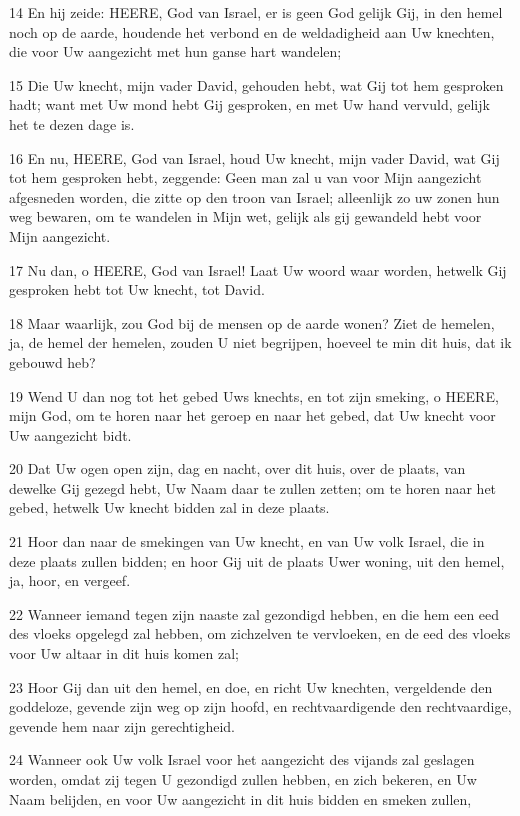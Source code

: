 \par 14 En hij zeide: HEERE, God van Israel, er is geen God gelijk Gij, in den hemel noch op de aarde, houdende het verbond en de weldadigheid aan Uw knechten, die voor Uw aangezicht met hun ganse hart wandelen;
\par 15 Die Uw knecht, mijn vader David, gehouden hebt, wat Gij tot hem gesproken hadt; want met Uw mond hebt Gij gesproken, en met Uw hand vervuld, gelijk het te dezen dage is.
\par 16 En nu, HEERE, God van Israel, houd Uw knecht, mijn vader David, wat Gij tot hem gesproken hebt, zeggende: Geen man zal u van voor Mijn aangezicht afgesneden worden, die zitte op den troon van Israel; alleenlijk zo uw zonen hun weg bewaren, om te wandelen in Mijn wet, gelijk als gij gewandeld hebt voor Mijn aangezicht.
\par 17 Nu dan, o HEERE, God van Israel! Laat Uw woord waar worden, hetwelk Gij gesproken hebt tot Uw knecht, tot David.
\par 18 Maar waarlijk, zou God bij de mensen op de aarde wonen? Ziet de hemelen, ja, de hemel der hemelen, zouden U niet begrijpen, hoeveel te min dit huis, dat ik gebouwd heb?
\par 19 Wend U dan nog tot het gebed Uws knechts, en tot zijn smeking, o HEERE, mijn God, om te horen naar het geroep en naar het gebed, dat Uw knecht voor Uw aangezicht bidt.
\par 20 Dat Uw ogen open zijn, dag en nacht, over dit huis, over de plaats, van dewelke Gij gezegd hebt, Uw Naam daar te zullen zetten; om te horen naar het gebed, hetwelk Uw knecht bidden zal in deze plaats.
\par 21 Hoor dan naar de smekingen van Uw knecht, en van Uw volk Israel, die in deze plaats zullen bidden; en hoor Gij uit de plaats Uwer woning, uit den hemel, ja, hoor, en vergeef.
\par 22 Wanneer iemand tegen zijn naaste zal gezondigd hebben, en die hem een eed des vloeks opgelegd zal hebben, om zichzelven te vervloeken, en de eed des vloeks voor Uw altaar in dit huis komen zal;
\par 23 Hoor Gij dan uit den hemel, en doe, en richt Uw knechten, vergeldende den goddeloze, gevende zijn weg op zijn hoofd, en rechtvaardigende den rechtvaardige, gevende hem naar zijn gerechtigheid.
\par 24 Wanneer ook Uw volk Israel voor het aangezicht des vijands zal geslagen worden, omdat zij tegen U gezondigd zullen hebben, en zich bekeren, en Uw Naam belijden, en voor Uw aangezicht in dit huis bidden en smeken zullen,

